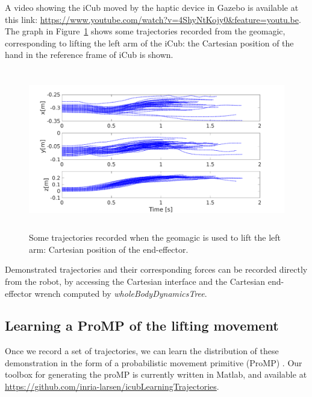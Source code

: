 A video showing the iCub moved by the haptic device in Gazebo is available at this link: \url{https://www.youtube.com/watch?v=4ShyNtKojy0&feature=youtu.be}.
The graph in Figure~\ref{fig:trajectories} shows some trajectories recorded from the geomagic, corresponding to lifting the left arm of the iCub: the Cartesian position of the hand in the reference frame of iCub is shown.
\begin{figure}[h]
\centering
\includegraphics[height=7cm]{figs/geomagic_lifting_trajectories.pdf}
\caption{Some trajectories recorded when the geomagic is used to lift the left arm: Cartesian position of the end-effector.}
\label{fig:trajectories}
\end{figure}

Demonstrated trajectories and their corresponding forces can be recorded directly from the robot, by accessing the Cartesian interface and the Cartesian end-effector wrench computed by \textit{wholeBodyDynamicsTree}.



 


\subsection{Learning a ProMP of the lifting movement}

Once we record a set of trajectories, we can learn the distribution of these demonstration in the form of a probabilistic movement primitive (ProMP) \cite{Paraschos_NIPS_2013a}.
Our toolbox for generating the proMP is currently written in Matlab, and available at \url{https://github.com/inria-larsen/icubLearningTrajectories}.

